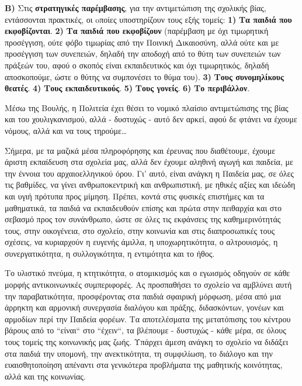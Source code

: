 \documentclass[12pt,a4paper,oneside]{book}
\begin{document}
\indent \textbf{B)} Στις \textbf{στρατηγικές παρέμβασης}, για την αντιμετώπιση
της σχολικής βίας, εντάσσονται πρακτικές, οι oποίες υποστηρίζουν τους εξής τομείς: \textbf{1)} \textbf{Τα παιδιά που εκφοβίζονται}. \textbf{2)}
\textbf{Τα παιδιά που εκφοβίζουν} (παρέμβαση με όχι τιμωρητική προσέγγιση, ούτε
φόβο τιμωρίας από την Ποινική Δικαιοσύνη, αλλά ούτε και με προσέγγιση των συνεπειών, δηλαδή την αποδοχή από
το θύτη των συνεπειών των πράξεών του, αφού ο σκοπός είναι εκπαιδευτικός και
όχι τιμωρητικός, δηλαδή αποσκοπούμε, ώστε ο θύτης να συμπονέσει το θύμα του).
\textbf{3)} \textbf{Τους συνομηλίκους θεατές}. \textbf{4)} \textbf{Τους
εκπαιδευτικούς}. \textbf{5)} \textbf{Τους γονείς}. \textbf{6)} \textbf{Το
περιβάλλον}.

\indent Μέσω της Βουλής, η Πολιτεία έχει θέσει το νομικό πλαίσιο αντιμετώπισης
της βίας και του χουλιγκανισμού, αλλά - δυστυχώς - αυτό δεν αρκεί, αφού δε φτάνει να έχουμε νόμους, αλλά και να
τους τηρούμε\ldots

\indent Σήμερα, με τα μαζικά μέσα πληροφόρησης και έρευνας που διαθέτουμε,
έχουμε άριστη εκπαίδευση στα σχολεία μας, αλλά δεν έχουμε αληθινή αγωγή και παιδεία, με την έννοια του
αρχαιοελληνικού όρου. Γι' αυτό, είναι ανάγκη η Παιδεία μας, σε όλες τις
βαθμίδες, να γίνει ανθρωποκεντρική και ανθρωπιστική, με ηθικές αξίες και ιδεώδη
και υγιή πρότυπα προς μίμηση. Πρέπει, κοντά στις φυσικές επιστήμες και τα
μαθηματικά, τα παιδιά να εκπαιδευθούν επίσης και πρώτα στην πειθαρχία και στο
σεβασμό προς τον συνάνθρωπο, ώστε σε όλες τις εκφάνσεις της καθημερινότητάς
τους, στην οικογένεια, στο σχολείο, στην κοινωνία και στις διαπροσωπικές τους
σχέσεις, να κυριαρχούν η ευγενής άμιλλα, η υποχωρητικότητα, ο αλτρουισμός, η
συνεργατικότητα, η συλλογικότητα, η εντιμότητα και το ήθος.

\indent Το υλιστικό πνεύμα, η κτητικότητα, ο ατομικισμός και ο εγωισμός οδηγούν
σε κάθε μορφής αντικοινωνικές συμπεριφορές. Ας προσπαθήσει το σχολείο να αμβλύνει αυτή την παραβατικότητα, προσφέροντας στα παιδιά σφαιρική μόρφωση, μέσα από μια άρρηκτη και αρμονική συνεργασία διαλόγου και πράξης, διδασκόντων, γονέων και αρμοδίων περί την Παιδεία φορέων. Τα αποτελέσματα της
μετατόπισης του κέντρου βάρους από το ``είναι`` στο ``έχειν``, τα βλέπουμε -
δυστυχώς - κάθε μέρα, σε όλους τους τομείς της κοινωνικής μας ζωής. Υπάρχει
άμεση ανάγκη το σχολείο να διδάξει στα παιδιά την υπομονή, την ανεκτικότητα, τη
συμφιλίωση, το διάλογο και την ευαισθητοποίηση απέναντι στα γενικότερα
προβλήματα της μαθητικής κοινότητας, αλλά και της κοινωνίας.
\end{document}
